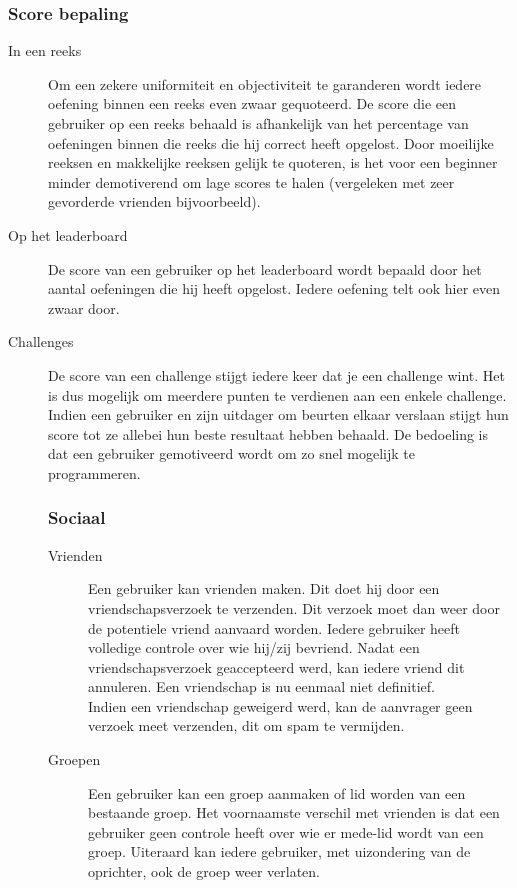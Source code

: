 \subsubsection{Score bepaling}
\begin{description}
\item[In een reeks] Om een zekere uniformiteit en objectiviteit te garanderen wordt iedere oefening binnen een reeks even zwaar gequoteerd. De score
    die een gebruiker op een reeks behaald is afhankelijk van het percentage van oefeningen binnen die reeks die hij correct heeft opgelost.
    Door moeilijke reeksen en makkelijke reeksen gelijk te quoteren, is het voor een beginner minder demotiverend om lage scores te halen
    (vergeleken met zeer gevorderde vrienden bijvoorbeeld).
\item[Op het leaderboard] De score van een gebruiker op het leaderboard wordt bepaald door het aantal oefeningen die hij heeft opgelost. Iedere oefening
    telt ook hier even zwaar door.
\item[Challenges] De score van een challenge stijgt iedere keer dat je een challenge wint. Het is dus mogelijk om meerdere punten te verdienen aan een enkele
    challenge. Indien een gebruiker en zijn uitdager om beurten elkaar verslaan stijgt hun score tot ze allebei hun beste resultaat hebben behaald. De bedoeling
    is dat een gebruiker gemotiveerd wordt om zo snel mogelijk te programmeren.

\subsubsection{Sociaal}
\begin{description}
\item[Vrienden] Een gebruiker kan vrienden maken. Dit doet hij door een vriendschapsverzoek te verzenden. Dit verzoek moet dan weer door
de potentiele vriend aanvaard worden. Iedere gebruiker heeft volledige controle over wie hij/zij bevriend. Nadat een vriendschapsverzoek
geaccepteerd werd, kan iedere vriend dit annuleren. Een vriendschap is nu eenmaal niet definitief. \\
Indien een vriendschap geweigerd werd, kan de aanvrager geen verzoek meet verzenden, dit om spam te vermijden.
\item[Groepen] Een gebruiker kan een groep aanmaken of lid worden van een bestaande groep. Het voornaamste verschil met vrienden is dat
een gebruiker geen controle heeft over wie er mede-lid wordt van een groep. Uiteraard kan iedere gebruiker, met uizondering van de oprichter,
ook de groep weer verlaten.
\end{description}


\end{description}
